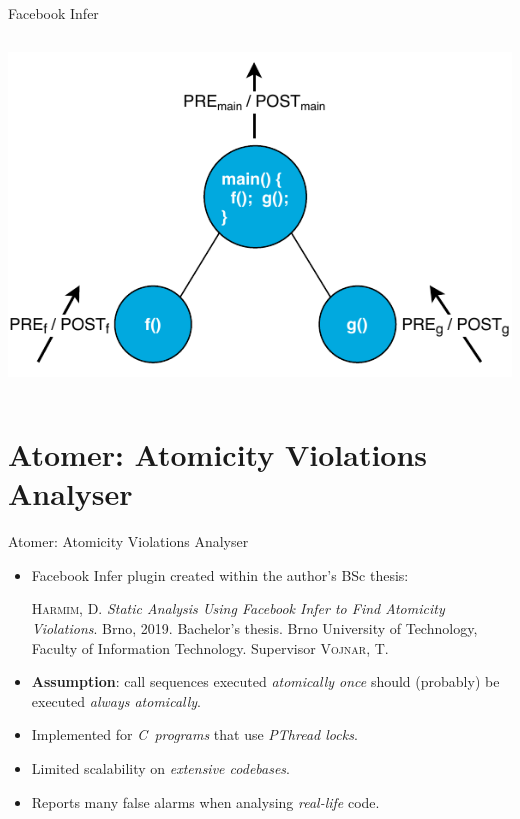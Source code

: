 \documentclass[10pt, xcolor=pdflatex, hyperref={unicode}, aspectratio=169]{beamer}
\begin{document}
\begin{frame}{Facebook Infer}
\begin{columns}
        \begin{column}{.45 \linewidth}
            \centering
            \includegraphics[width=1 \linewidth]{infer.pdf}
        \end{column}
    \end{columns}
\end{frame}




\section{Atomer: Atomicity Violations Analyser}
\begin{frame}{Atomer: Atomicity Violations Analyser}
    \begin{itemize}\setlength\itemsep{1.5em}
        \item \alert{Facebook Infer plugin} created within the author's BSc thesis:
            \medskip
            \begin{thebibliography}{1}
                \textsc{Harmim, D.} \textit{Static Analysis Using Facebook Infer to Find Atomicity Violations}. Brno, 2019. Bachelor's thesis. Brno University of Technology, Faculty of Information Technology. Supervisor \textsc{Vojnar, T.}
            \end{thebibliography}

        \item \textbf{Assumption}: \alert{call sequences} executed \emph{atomically once} should (probably) be executed \emph{always atomically}.

        \item Implemented for \emph{C~programs} that use \emph{PThread locks}.

        \item Limited \alert{scalability} on \emph{extensive codebases}.

        \item Reports many \alert{false alarms} when analysing \emph{real-life} code.
    \end{itemize}
\end{frame}
\end{document}
